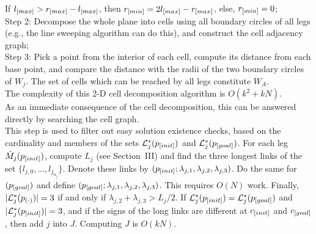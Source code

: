 If $l_{\textit{\rm{[}}max]}>r_{\textit{\rm{[}}max]}-l_{\textit{\rm{[}}max]}$, then
$r_{\textit{\rm{[}}min]}=2l_{\textit{\rm{[}}max]}-r_{\textit{\rm{[}}max]}$, else,
$r_{\textit{\rm{[}}min]}=0$;\\
Step 2: Decompose the whole plane into cells using all boundary
circles of all legs (e.g., the line sweeping algorithm can do
this), and construct the cell adjacency graph;\\
Step 3: Pick a point from the interior of each cell, compute its
distance from each base point, and compare the distance with the
radii of the two boundary circles of $W_j$. The set of cells which
can be reached by all legs constitute $W_A$.\\
The complexity of this 2-D cell decomposition algorithm is
$O(k^2+kN)$.
\medskip \\
 As an immediate consequence of the cell
decomposition, this can be answered directly by searching the cell
graph.
\medskip  \\
 This step is used to filter out easy
solution existence checks, based on the cardinality and members of
the sets ${\cal L}_j^*(p_{\textit{\rm{[}}init]})$ and ${\cal
L}_j^*(p_{\textit{\rm{[}}goal]})$. For each leg $\tilde
M_j(p_{\textit{\rm{[}}init]})$, compute $L_j$ (see Section~III) and find
the three longest links of the set $\{l_{j,0},...,l_{j_{n_j}} \}$.
Denote these links by $(p_{\textit{\rm{[}}init]};
\lambda_{j,1},\lambda_{j,2},\lambda_{j,3})$. Do the same for
$(p_{\textit{\rm{[}}goal]})$ and define $(p_{\textit{\rm{[}}goal]};
\lambda_{j,1},\lambda_{j,2},\lambda_{j,3})$. This requires $O(N)$
work. Finally, $|{\cal L}_j^*(p_{(\cdot)})| = 3$ if and only if
$\lambda_{j,2} + \lambda_{j,3} > L_j/2$.  If ${\cal
L}_j^*(p_{\textit{\rm{[}}init]}) = {\cal L}_j^*(p_{\textit{\rm{[}}goal]})$ and
$|{\cal L}_j^*(p_{\textit{\rm{[}}init]})| = 3$, and if the signs of the
long links are different at $c_{\textit{\rm{[}}init]}$ and
$c_{\textit{\rm{[}}goal]}$, then add $j$ into $J$.
Computing $J$ is $O(kN)$. \medskip  \\

